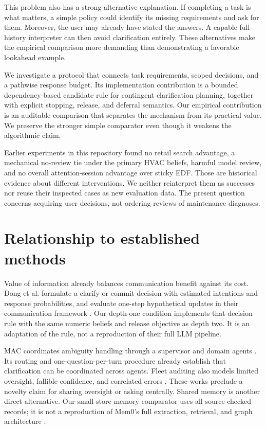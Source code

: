 \documentclass[11pt]{article}
\begin{document}
This problem also has a strong alternative explanation. If completing a task is what matters, a simple policy could identify its missing requirements and ask for them. Moreover, the user may already have stated the answers. A capable full-history interpreter can then avoid clarification entirely. These alternatives make the empirical comparison more demanding than demonstrating a favorable lookahead example.

We investigate a protocol that connects task requirements, scoped decisions, and a pathwise response budget. Its implementation contribution is a bounded dependency-based candidate rule for contingent clarification planning, together with explicit stopping, release, and deferral semantics. Our empirical contribution is an auditable comparison that separates the mechanism from its practical value. We preserve the stronger simple comparator even though it weakens the algorithmic claim.

Earlier experiments in this repository found no retail search advantage, a mechanical no-review tie under the primary HVAC beliefs, harmful model review, and no overall attention-session advantage over sticky EDF. Those are historical evidence about different interventions. We neither reinterpret them as successes nor reuse their inspected cases as new evaluation data. The present question concerns acquiring user decisions, not ordering reviews of maintenance diagnoses.

\section{Relationship to established methods}
Value of information already balances communication benefit against its cost. Dong et al. formulate a clarify-or-commit decision with estimated intentions and response probabilities, and evaluate one-step hypothetical updates in their communication framework \citep{dong2026voi}. Our depth-one condition implements that decision rule with the same numeric beliefs and release objective as depth two. It is an adaptation of the rule, not a reproduction of their full LLM pipeline.

MAC coordinates ambiguity handling through a supervisor and domain agents \citep{acikgoz2026mac}. Its routing and one-question-per-turn procedure already establish that clarification can be coordinated across agents. Fleet auditing also models limited oversight, fallible confidence, and correlated errors \citep{zavattari2026fleet}. These works preclude a novelty claim for sharing oversight or asking centrally. Shared memory is another direct alternative. Our small-store memory comparator uses all source-checked records; it is not a reproduction of Mem0's full extraction, retrieval, and graph architecture \citep{chhikara2025mem0}.
\end{document}
